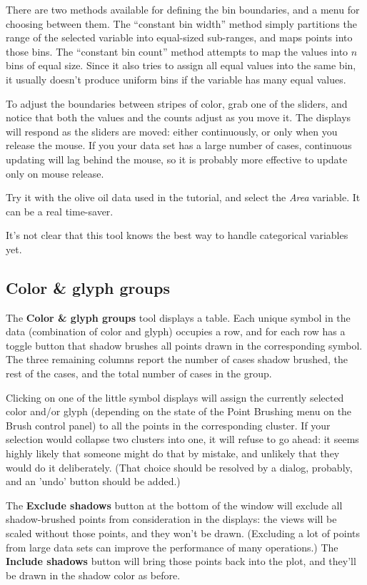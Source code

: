 \documentclass[11pt]{article}
\begin{document}
There are two methods available for defining the bin boundaries, and
a menu for choosing between them.  The ``constant bin width'' method
simply partitions the range of the selected variable into equal-sized
sub-ranges, and maps points into those bins.  The ``constant bin
count'' method attempts to map the values into $n$ bins of equal
size.  Since it also tries to assign all equal values into the same
bin, it usually doesn't produce uniform bins if the variable has many
equal values.

To adjust the boundaries between stripes of color, grab one of the
sliders, and notice that both the values and the counts adjust as you
move it.  The displays will respond as the sliders are moved:  either
continuously, or only when you release the mouse.  If you your data set
has a large number of cases, continuous updating will lag behind the
mouse, so it is probably more effective to update only on mouse release.

Try it with the olive oil data used in the tutorial, and select the {\it
Area} variable.  It can be a real time-saver.

It's not clear that this tool knows the best way to handle categorical
variables yet.

\subsection{Color \& glyph groups}
\label{slbl:ColorAndGlyphGroups}

The {\bf Color \& glyph groups} tool displays a table.  Each unique
symbol in the data (combination of color and glyph) occupies a row,
and for each row has a toggle button that shadow brushes all points
drawn in the corresponding symbol.  The three remaining columns
report the number of cases shadow brushed, the rest of the cases, and
the total number of cases in the group.

Clicking on one of the little symbol displays will assign the
currently selected color and/or glyph (depending on the state of the
Point Brushing menu on the Brush control panel) to all the points in
the corresponding cluster.  If your selection would collapse two
clusters into one, it will refuse to go ahead:  it seems highly
likely that someone might do that by mistake, and unlikely that they
would do it deliberately.  (That choice should be resolved by a
dialog, probably, and an 'undo' button should be added.)

The {\bf Exclude shadows} button at the bottom of the window will
exclude all shadow-brushed points from consideration in the
displays:  the views will be scaled without those points, and they
won't be drawn.  (Excluding a lot of points from large data sets can
improve the performance of many operations.)
The {\bf Include shadows} button will bring those
points back into the plot, and they'll be drawn in the shadow color
as before.
\end{document}
